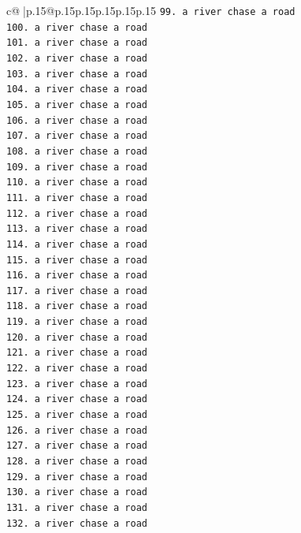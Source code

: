 \documentclass{article}
\begin{document}
{\begin{supertabular}{c@{$\;$}|p{.15\linewidth}@{}p{.15\linewidth}p{.15\linewidth}p{.15\linewidth}p{.15\linewidth}p{.15\linewidth}}
{{{\texttt{99. a river chase a road} \\
\texttt{100. a river chase a road} \\
\texttt{101. a river chase a road} \\
\texttt{102. a river chase a road} \\
\texttt{103. a river chase a road} \\
\texttt{104. a river chase a road} \\
\texttt{105. a river chase a road} \\
\texttt{106. a river chase a road} \\
\texttt{107. a river chase a road} \\
\texttt{108. a river chase a road} \\
\texttt{109. a river chase a road} \\
\texttt{110. a river chase a road} \\
\texttt{111. a river chase a road} \\
\texttt{112. a river chase a road} \\
\texttt{113. a river chase a road} \\
\texttt{114. a river chase a road} \\
\texttt{115. a river chase a road} \\
\texttt{116. a river chase a road} \\
\texttt{117. a river chase a road} \\
\texttt{118. a river chase a road} \\
\texttt{119. a river chase a road} \\
\texttt{120. a river chase a road} \\
\texttt{121. a river chase a road} \\
\texttt{122. a river chase a road} \\
\texttt{123. a river chase a road} \\
\texttt{124. a river chase a road} \\
\texttt{125. a river chase a road} \\
\texttt{126. a river chase a road} \\
\texttt{127. a river chase a road} \\
\texttt{128. a river chase a road} \\
\texttt{129. a river chase a road} \\
\texttt{130. a river chase a road} \\
\texttt{131. a river chase a road} \\
\texttt{132. a river chase a road} \\
}}}
\end{supertabular}}
\end{document}
